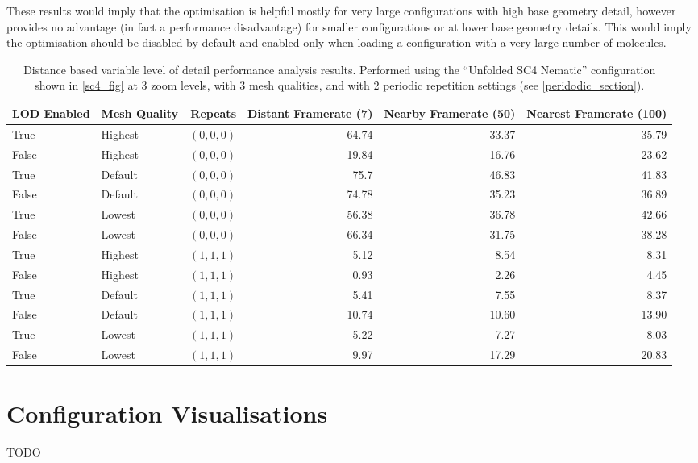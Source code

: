 These results would imply that the optimisation is helpful mostly for very large configurations with high base geometry detail, however provides no advantage (in fact a performance disadvantage) for smaller configurations or at lower base geometry details. This would imply the optimisation should be disabled by default and enabled only when loading a configuration with a very large number of molecules.
\begin{table}
  \begin{center}
  \begin{adjustbox}{width=\textwidth}
    \begin{tabular}{llrrrr}
    \hline
    \hline
    LOD Enabled & Mesh Quality & Repeats & Distant Framerate (7) & Nearby Framerate (50) & Nearest Framerate (100)\\
    \hline
    True & Highest & $(0,0,0)$ & 64.74 &  33.37 & 35.79 \\
    False & Highest & $(0,0,0)$ & 19.84 & 16.76 & 23.62 \\
    
    True & Default & $(0,0,0)$ & 75.7 & 46.83 & 41.83 \\
    False & Default & $(0,0,0)$ & 74.78 & 35.23 & 36.89 \\
    
    True & Lowest & $(0,0,0)$ & 56.38 & 36.78 & 42.66\\
    False & Lowest & $(0,0,0)$ & 66.34 & 31.75 & 38.28\\
    \hline
    True & Highest & $(1,1,1)$ & 5.12 & 8.54 & 8.31 \\
    False & Highest & $(1,1,1)$ & 0.93 & 2.26 & 4.45 \\
    
    True & Default & $(1,1,1)$ & 5.41 & 7.55 & 8.37 \\
    False & Default & $(1,1,1)$ & 10.74 & 10.60 & 13.90 \\
    
    True & Lowest & $(1,1,1)$ & 5.22 & 7.27 & 8.03\\
    False & Lowest & $(1,1,1)$ & 9.97 & 17.29 & 20.83\\
    \hline
    \hline
    \end{tabular}
  \end{adjustbox}
  \end{center}
  \caption{Distance based variable level of detail performance analysis results. Performed using the ``Unfolded SC4 Nematic'' configuration shown in \cref{sc4_fig} at 3 zoom levels, with 3 mesh qualities, and with 2 periodic repetition settings (see \cref{peridodic_section}).}
  \label{tab:lod_test}
\end{table}

\section{Configuration Visualisations}
TODO
